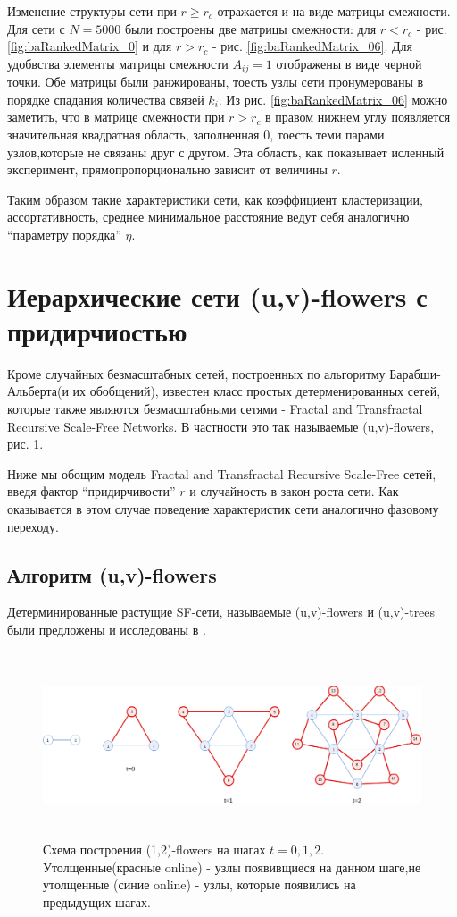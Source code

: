 \documentclass[10pt,aps,pra]{revtex4-1}
\begin{document}
Изменение структуры сети при $r \geq r_c$ отражается и на виде матрицы смежности. Для сети с $N=5000$ были построены две матрицы смежности: для $r<r_c$ - рис. \ref{fig:baRankedMatrix_0} и для $r>r_c$ - рис. \ref{fig:baRankedMatrix_06}. Для удобвства элементы матрицы смежности $A_{ij}=1$ отображены  в виде черной точки. Обе матрицы были ранжированы, тоесть узлы сети пронумерованы в порядке спадания количества связей $k_i$. Из рис. \ref{fig:baRankedMatrix_06} можно заметить, что в матрице смежности при $r>r_c$ в правом нижнем углу появляется значительная квадратная область, заполненная 0, тоесть теми парами узлов,которые не связаны друг с другом. Эта область, как показывает исленный эксперимент, прямопропорционально зависит от величины $r$.

Таким образом такие характеристики сети, как коэффициент кластеризации, ассортативность, среднее минимальное расстояние ведут себя аналогично ``параметру порядка'' $\eta$.

\section{Иерархические сети (u,v)-flowers с придирчиостью}
Кроме случайных безмасштабных сетей, построенных по альгоритму Барабши-Альберта(и их обобщений), известен класс простых детерменированных сетей, которые также являются безмасштабными сетями \cite{Rozenfeld2} - Fractal and Transfractal Recursive Scale-Free Networks. В частности это так называемые (u,v)-flowers, рис. \ref{fig:flowerGraph}.

Ниже мы обощим модель Fractal and Transfractal Recursive Scale-Free сетей, введя фактор ``придирчивости'' $r$ и случайность в закон роста сети. Как оказывается в этом случае поведение характеристик сети аналогично фазовому переходу.

\subsection{Алгоритм (u,v)-flowers}
Детерминированные растущие SF-сети, называемые (u,v)-flowers и (u,v)-trees были предложены и исследованы в \cite{Dor1,Rozenfeld1,Rozenfeld2}.

\begin{figure}[H]

\centering
\includegraphics[height=5.5cm]{graphics/hierarhical.png}
\caption{
\label{fig:flowerGraph}
Схема построения (1,2)-flowers на шагах $t=0,1,2$. Утолщенные(красные online) - узлы появивщиеся на данном шаге,не утолщенные (синие online) - узлы, которые появились на предыдущих шагах.}
\end{figure}
\end{document}
